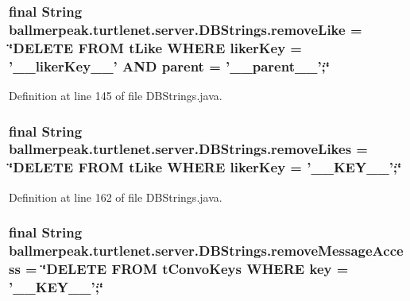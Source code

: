 \hypertarget{classballmerpeak_1_1turtlenet_1_1server_1_1DBStrings_a17b087b58c02d5e260242f71add2c9ca}{
\subsubsection[{remove\-Like}]{\setlength{\rightskip}{0pt plus 5cm}final String ballmerpeak.\-turtlenet.\-server.\-D\-B\-Strings.\-remove\-Like = \char`\"{}D\-E\-L\-E\-T\-E F\-R\-O\-M t\-Like W\-H\-E\-R\-E liker\-Key = '\-\_\-\-\_\-liker\-Key\-\_\-\-\_\-' A\-N\-D parent = '\-\_\-\-\_\-parent\-\_\-\-\_\-';\char`\"{}\hspace{0.3cm}{\ttfamily [static]}}}\label{classballmerpeak_1_1turtlenet_1_1server_1_1DBStrings_a17b087b58c02d5e260242f71add2c9ca}


Definition at line 145 of file D\-B\-Strings.\-java.

\hypertarget{classballmerpeak_1_1turtlenet_1_1server_1_1DBStrings_a93fcbcf4eaf96862a3db95dec6b1fbcb}{
\subsubsection[{remove\-Likes}]{\setlength{\rightskip}{0pt plus 5cm}final String ballmerpeak.\-turtlenet.\-server.\-D\-B\-Strings.\-remove\-Likes = \char`\"{}D\-E\-L\-E\-T\-E F\-R\-O\-M t\-Like W\-H\-E\-R\-E liker\-Key = '\-\_\-\-\_\-\-K\-E\-Y\-\_\-\-\_\-';\char`\"{}\hspace{0.3cm}{\ttfamily [static]}}}\label{classballmerpeak_1_1turtlenet_1_1server_1_1DBStrings_a93fcbcf4eaf96862a3db95dec6b1fbcb}


Definition at line 162 of file D\-B\-Strings.\-java.

\hypertarget{classballmerpeak_1_1turtlenet_1_1server_1_1DBStrings_aa376b74543195cc63ee7e443131d2822}{
\subsubsection[{remove\-Message\-Access}]{\setlength{\rightskip}{0pt plus 5cm}final String ballmerpeak.\-turtlenet.\-server.\-D\-B\-Strings.\-remove\-Message\-Access = \char`\"{}D\-E\-L\-E\-T\-E F\-R\-O\-M t\-Convo\-Keys W\-H\-E\-R\-E key = '\-\_\-\-\_\-\-K\-E\-Y\-\_\-\-\_\-';\char`\"{}\hspace{0.3cm}{\ttfamily [static]}}}\label{classballmerpeak_1_1turtlenet_1_1server_1_1DBStrings_aa376b74543195cc63ee7e443131d2822}


